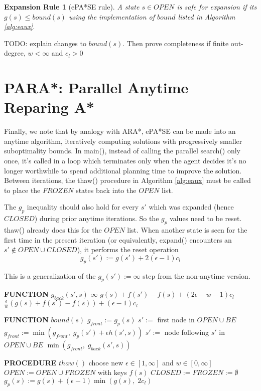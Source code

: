 \documentclass[letterpaper]{article}
\newtheorem{rul}{Expansion Rule}
\begin{document}
\begin{rul}[ePA*SE rule]
A state $s\in OPEN$ is safe for expansion if its $g(s) \le bound(s)$ using the implementation of $bound$ listed in Algorithm \ref{alg:eaux}.
\end{rul}

TODO: explain changes to $bound(s)$.  Then prove completeness if finite out-degree, $w<\infty$ and $c_l > 0$

\section{PARA*: Parallel Anytime Reparing A*}

Finally, we note that by analogy with ARA*, ePA*SE can be made into an anytime algorithm, iteratively computing solutions with progressively smaller suboptimality bounds. In main(), instead of calling the parallel search() only once, it's called in a loop which terminates only when the agent decides it's no longer worthwhile to spend additional planning time to improve the solution. Between iterations, the thaw() procedure in Algorithm \ref{alg:eaux} must be called to place the $FROZEN$ states back into the $OPEN$ list.

The $g_p$ inequality should also hold for every $s'$ which was expanded (hence $CLOSED$) during prior anytime iterations. So the $g_p$ values need to be reset. thaw() already does this for the $OPEN$ list. When another state is seen for the first time in the present iteration (or equivalently, expand() encounters an $s'\notin OPEN\cup CLOSED$), it performs the reset operation
\[g_p(s') := g(s') + 2(\epsilon-1)c_l\]

This is a generalization of the $g_p(s') := \infty$ step from the non-anytime version.

\begin{algorithm}
\caption{Auxiliary Functions ePA*SE}
\label{alg:eaux}
\begin{algorithmic}
\STATE \textbf{FUNCTION} $g_{back}(s',s)$
\RETURN $\infty$
\RETURN $g(s) + f(s') - f(s) + (2\epsilon-w-1)c_l$
\ELSE
\RETURN $\frac\epsilon w\left(g(s) + f(s') - f(s)\right) + (\epsilon-1)c_l$
\ENDIF

\STATE \textbf{FUNCTION} $bound(s)$
\STATE $g_{front} := g_p(s)$
\STATE $s' :=$ first node in $OPEN \cup BE$
\STATE $g_{front} := \min(g_{front},\;g_p(s') + \epsilon h(s',s))$
\STATE $s' :=$ node following $s'$ in $OPEN \cup BE$
\ENDWHILE
\RETURN $\min(g_{front},\;g_{back}(s',s))$

\STATE \textbf{PROCEDURE} $thaw()$
\STATE choose new $\epsilon \in [1,\infty]$ and $w \in [0,\infty]$
\STATE $OPEN := OPEN \cup FROZEN$ with keys $f(s)$
\STATE $CLOSED := FROZEN := \emptyset$
\STATE $g_p(s) := g(s) + (\epsilon-1)\min(g(s),\;2c_l)$
\ENDFOR
\end{algorithmic}
\end{algorithm}
\end{document}

